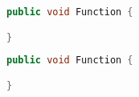 \label{app:Listing1}
\begin{lstlisting}[language=Java, caption=NAME]
public void Function {

}
\end{lstlisting}
%
%
\begin{lstlisting}[language=Java, caption=NAME]
public void Function {

}
\end{lstlisting}
